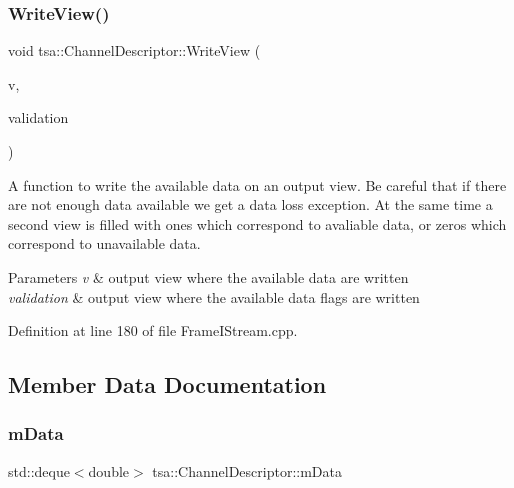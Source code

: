 \subsubsection{\texorpdfstring{Write\+View()}{WriteView()}\hspace{0.1cm}{\footnotesize\ttfamily [2/2]}}
{\footnotesize\ttfamily void tsa\+::\+Channel\+Descriptor\+::\+Write\+View (\begin{DoxyParamCaption}\item[{\hyperlink{namespacetsa_ac599574bcc094eda25613724b8f3ca9e}{Seq\+View\+Double} \&}]{v,  }\item[{\hyperlink{namespacetsa_ac599574bcc094eda25613724b8f3ca9e}{Seq\+View\+Double} \&}]{validation }\end{DoxyParamCaption})\hspace{0.3cm}{\ttfamily [virtual]}}

A function to write the available data on an output view. Be careful that if there are not enough data available we get a data loss exception. At the same time a second view is filled with ones which correspond to avaliable data, or zeros which correspond to unavailable data.


\begin{DoxyParams}{Parameters}
{\em v} & output view where the available data are written \\
\hline
{\em validation} & output view where the available data flags are written \\
\hline
\end{DoxyParams}


Definition at line 180 of file Frame\+I\+Stream.\+cpp.



\subsection{Member Data Documentation}
\mbox{\label{classtsa_1_1_channel_descriptor_ad1568c18971efe9a5cb1d114e06f5050}} 
\subsubsection{\texorpdfstring{m\+Data}{mData}}
{\footnotesize\ttfamily std\+::deque$<$double$>$ tsa\+::\+Channel\+Descriptor\+::m\+Data\hspace{0.3cm}{\ttfamily [protected]}}

